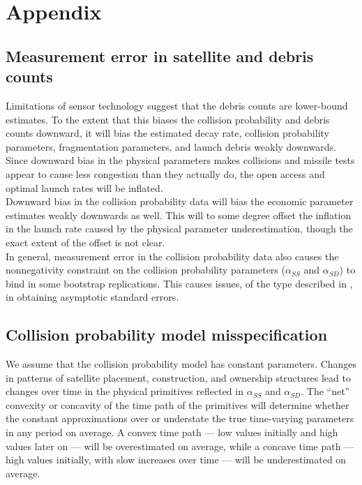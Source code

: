 \documentclass[12pt]{article}
\begin{document}
\newpage

{
	\setlength{\bibsep}{3pt}
	
	
}

\newpage

\section{Appendix}

\subsection{Measurement error in satellite and debris counts}
\label{physicsMeasurementError}

Limitations of sensor technology suggest that the debris counts are lower-bound estimates. To the extent that this biases the collision probability and debris counts downward, it will bias the estimated decay rate, collision probability parameters, fragmentation parameters, and launch debris weakly downwards. Since downward bias in the physical parameters makes collisions and missile tests appear to cause less congestion than they actually do, the open access and optimal launch rates will be inflated.\\

Downward bias in the collision probability data will bias the economic parameter estimates weakly downwards as well. This will to some degree offset the inflation in the launch rate caused by the physical parameter underestimation, though the exact extent of the offset is not clear. \\

In general, measurement error in the collision probability data also causes the nonnegativity constraint on the collision probability parameters ($\alpha_{SS}$ and $\alpha_{SD}$) to bind in some bootstrap replications. This causes issues, of the type described in \citep{ketz2018}, in obtaining asymptotic standard errors.

\subsection{Collision probability model misspecification}

We assume that the collision probability model has constant parameters. Changes in patterns of satellite placement, construction, and ownership structures lead to changes over time in the physical primitives reflected in $\alpha_{SS}$ and $\alpha_{SD}$. The ``net'' convexity or concavity of the time path of the primitives will determine whether the constant approximations over or understate the true time-varying parameters in any period on average. A convex time path --- low values initially and high values later on --- will be overestimated on average, while a concave time path --- high values initially, with slow increases over time --- will be underestimated on average. \\
\end{document}
